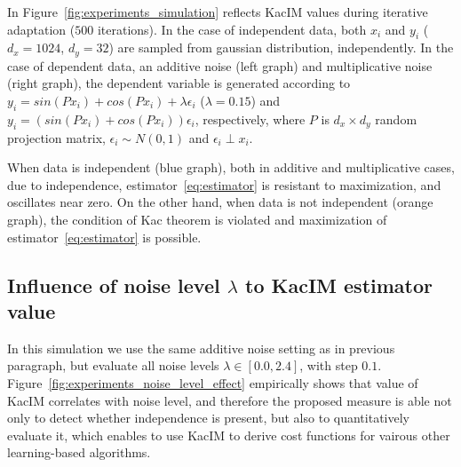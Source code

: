 \documentclass{article}
\begin{document}
In Figure~\ref{fig:experiments_simulation} reflects KacIM values during iterative adaptation ($500$ iterations). In the case of independent data, both $x_{i}$ and $y_{i}$ ($d_{x} = 1024$, $d_{y} = 32$) are sampled from gaussian distribution, independently. In the case of dependent data, an additive noise (left graph) and multiplicative noise (right graph), the dependent variable is generated according to $y_{i} = sin(P x_{i}) + cos(P x_{i}) + \lambda \epsilon_{i}$ ($\lambda = 0.15$) and $y_{i} = (sin(P x_{i}) + cos(P x_{i})) \epsilon_{i}$, respectively, where $P$ is $d_{x} \times d_{y}$ random projection matrix, $\epsilon_{i} \sim N(0,1)$ and $\epsilon_{i} \perp x_{i}$.

When data is independent (blue graph), both in additive and multiplicative cases, due to independence, estimator~\eqref{eq:estimator} is resistant to maximization, and oscillates near zero. On the other hand, when data is not independent (orange graph), the condition of Kac theorem is violated and maximization of estimator~\eqref{eq:estimator} is possible.

\subsection{Influence of noise level $\lambda$ to KacIM estimator value}
In this simulation we use the same additive noise setting as in previous paragraph, but evaluate all noise levels $\lambda \in [0.0, 2.4]$, with step $0.1$.
Figure~\ref{fig:experiments_noise_level_effect} empirically shows that value of KacIM correlates with noise level, and therefore the proposed measure is able not only to detect whether independence is present, but also to quantitatively evaluate it, which enables to use KacIM to derive cost functions for vairous other learning-based algorithms. %
\end{document}
